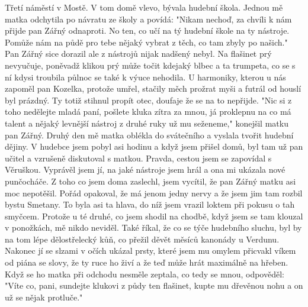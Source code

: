 
Třetí náměstí v Mostě. V tom domě vlevo, bývala hudební škola. Jednou
mě matka odchytila po návratu ze školy a povídá: "Nikam nechoď, za
chvíli k nám přijde pan Zářný odnaproti. No ten, co učí na tý hudební
škole na ty nástroje. Pomůže nám na půdě pro tebe nějaký vybrat z
těch, co tam zbyly po našich." Pan Zářný sice dorazil ale z nástrojů
nijak nadšený nebyl. Na flašinet prý nevyučuje, poněvadž klikou prý
může točit kdejaký blbec a ta trumpeta, co se s ní kdysi troubila
půlnoc se také k výuce nehodila. U harmoniky, kterou u nás zapoměl pan
Kozelka, protože umřel, stačily měch prožrat myši a futrál od houslí
byl prázdný. Ty totiž stihnul propít otec, doufaje že se na to
nepřijde. "Nic si z toho nedělejte mladá paní, pošlete kluka zítra za
mnou, já proklepnu na co má talent a nějaký levnější nástroj z druhé
ruky už mu seženeme," konejšil matku pan Zářný. Druhý den mě matka
oblékla do svátečního a vyslala tvořit hudební dějiny. V hudebce jsem
pobyl asi hodinu a když jsem přišel domů, byl tam už pan učitel a
vzrušeně diskutoval s matkou. Pravda, cestou jsem se zapovídal s
Věruškou. Vyprávěl jsem jí, na jaké nástroje jsem hrál a ona mi
ukázala nové punčocháče. Z toho co jsem doma zaslechl, jsem vycítil, že pan
Zářný matku asi moc nepotěšil. Pořád opakoval, že má jenom jedny nervy
a že jsem jim tam rozbil bystu Smetany. To byla asi ta hlava, do níž
jsem vrazil loktem při pokusu o tah smyčcem. Protože u té druhé, co
jsem shodil na chodbě, když jsem se tam klouzal v ponožkách, mě nikdo
neviděl. Také říkal, že co se týče hudebního sluchu, byl by na tom
lépe dělostřelecký kůň, co přežil děvět měsíců kanonády u Verdunu.
Nakonec jí se slzami v očích ukázal prsty, které jsem mu omylem
přicvakl víkem od piána se slovy, že ty ruce ho živí a že teď může
hrát maximálně na hřeben. Když se ho matka při odchodu nesměle
zeptala, co tedy se mnou, odpověděl: "Víte co, pani, sundejte klukovi
z půdy ten flašinet, kupte mu dřevěnou nohu a on už se nějak
protluče."
